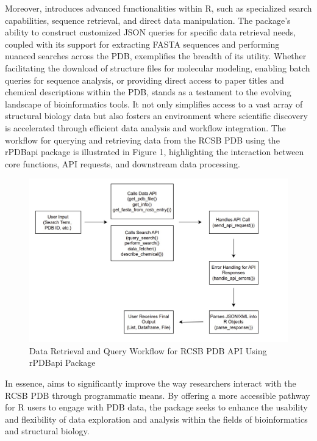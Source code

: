 Moreover,  introduces advanced functionalities within R, such as specialized search capabilities, sequence retrieval, and direct data manipulation. The package's ability to construct customized JSON queries for specific data retrieval needs, coupled with its support for extracting FASTA sequences and performing nuanced searches across the PDB, exemplifies the breadth of its utility. Whether facilitating the download of structure files for molecular modeling, enabling batch queries for sequence analysis, or providing direct access to paper titles and chemical descriptions within the PDB,  stands as a testament to the evolving landscape of bioinformatics tools. It not only simplifies access to a vast array of structural biology data but also fosters an environment where scientific discovery is accelerated through efficient data analysis and workflow integration. The workflow for querying and retrieving data from the RCSB PDB using the rPDBapi package is illustrated in Figure 1, highlighting the interaction between core functions, API requests, and downstream data processing.

\begin{figure}[H]
\includegraphics[width=1\linewidth,]{figures/flow_diagram} \caption{Data Retrieval and Query Workflow for RCSB PDB API Using rPDBapi Package}\label{fig:figure1}
\end{figure}

In essence,  aims to significantly improve the way researchers interact with the RCSB PDB through programmatic means. By offering a more accessible pathway for R users to engage with PDB data, the package seeks to enhance the usability and flexibility of data exploration and analysis within the fields of bioinformatics and structural biology.

